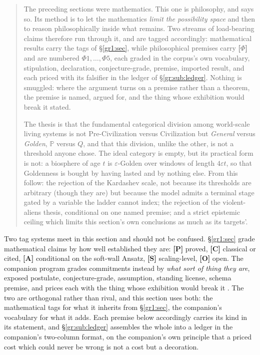 \documentclass[11pt]{article}
\numberwithin{equation}{section}
\theoremstyle{plain}
\theoremstyle{definition}
\theoremstyle{remark}
\newcommand{\PP}{\mathbb{P}}
\begin{document}
\begin{quote}\small
The preceding sections were mathematics. This one is philosophy, and
says so. Its method is to let the mathematics \emph{limit the
possibility space} and then to reason philosophically inside what
remains. Two streams of load-bearing claims therefore run through it,
and are tagged accordingly: mathematical results carry the tags of
\S\ref{gr1:sec}, while philosophical premises carry \textbf{[$\Phi$]} and
are numbered $\Phi1,\dots,\Phi5$, each graded in the corpus's own
vocabulary, stipulation, declaration, conjecture-grade, premise,
imported result, and each priced with its falsifier in the ledger of
\S\ref{gr:sub:ledger}. Nothing is smuggled: where the argument turns on
a premise rather than a theorem, the premise is named, argued for, and
the thing whose exhibition would break it stated.

The thesis is that the fundamental categorical division among
world-scale living systems is not Pre-Civilization versus Civilization
but \emph{General} versus \emph{Golden}, $\PP$ versus $Q$, and
that this division, unlike the other, is not a threshold anyone chose.
The ideal category is empty, but its practical form is not: a biosphere
of age $t$ is $\varepsilon$-Golden over windows of length $4\varepsilon
t$, so that Goldenness is bought by having lasted and by nothing else.
From this follow: the rejection of the Kardashev scale, not because its
thresholds are arbitrary (though they are) but because the model admits
a terminal stage gated by a variable the ladder cannot index; the rejection of the
violent-aliens thesis, conditional on one named premise; and a strict
epistemic ceiling which limits this section's own conclusions as much as
its targets'.
\end{quote}

\label{gr:sub:grades}

Two tag systems meet in this section and should not be confused.
\S\ref{gr1:sec} grade mathematical claims by how well established they
are: \textbf{[P]} proved, \textbf{[C]} classical or cited, \textbf{[A]}
conditional on the soft-wall Ansatz, \textbf{[S]} scaling-level,
\textbf{[O]} open. The companion program grades commitments instead by
\emph{what sort of thing they are}, exposed postulate,
conjecture-grade, assumption, standing license, schema premise, and
prices each with the thing whose exhibition would break it
\cite{Nexus, Ben26Found, Ben26Optimal}. The two are orthogonal
rather than rival, and this section uses both: the mathematical tags for
what it inherits from \S\ref{gr1:sec}, the companion's vocabulary for what
it adds. Each premise below accordingly carries its kind in its
statement, and \S\ref{gr:sub:ledger} assembles the whole into a ledger
in the companion's two-column format, on the companion's own principle
that a priced cost which could never be wrong is not a cost but a
decoration.
\end{document}
